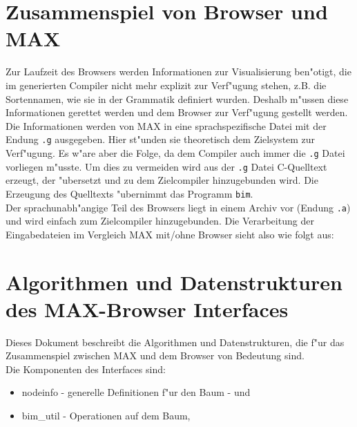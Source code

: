 \section{Zusammenspiel von Browser und MAX}
Zur Laufzeit des Browsers werden Informationen zur Visualisierung 
ben"otigt, die im generierten Compiler nicht mehr explizit zur
Verf"ugung stehen, z.B. die Sortennamen, wie sie in der Grammatik
definiert wurden. Deshalb m"ussen diese Informationen gerettet
werden und dem Browser zur Verf"ugung gestellt werden.\\
Die Informationen werden von MAX in eine sprachspezifische Datei mit
der Endung {\tt .g} ausgegeben. Hier st"unden sie theoretisch dem
Zielsystem zur Verf"ugung. Es w"are aber die Folge, da\3 dem Compiler
auch immer die {\tt .g} Datei vorliegen m"usste. Um dies zu vermeiden
wird aus der {\tt .g} Datei C-Quelltext erzeugt, der "ubersetzt und
zu dem Zielcompiler hinzugebunden wird. Die Erzeugung des Quelltexts
"ubernimmt das Programm {\tt bim}.\\
Der sprachunabh"angige Teil des Browsers liegt in einem Archiv vor
(Endung {\tt .a}) und wird einfach zum Zielcompiler hinzugebunden.
Die Verarbeitung der Eingabedateien im Vergleich MAX mit/ohne Browser
sieht also wie folgt aus:


\section{Algorithmen und Datenstrukturen des MAX-Browser Interfaces}
Dieses Dokument beschreibt die Algorithmen und Datenstrukturen,
die f"ur das Zusammenspiel zwischen MAX und dem Browser von Bedeutung 
sind.\\
Die Komponenten des Interfaces sind:\\
\begin{itemize}
	\item nodeinfo - generelle Definitionen f"ur den Baum - und
	\item bim\_util - Operationen auf dem Baum,
	
\end{itemize}

